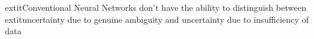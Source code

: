 \documentclass[preview]{standalone}
\begin{document}
\begin{center}
extit{Conventional Neural Networks don't have the ability to distinguish between }	extit{uncertainty due to genuine ambiguity and uncertainty due to insufficiency of data}
\end{center}
\end{document}
